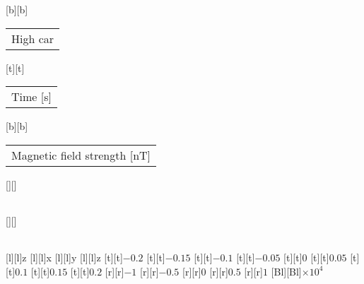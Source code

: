 %
[b][b]{\fontsize{8}{12}\selectfont \setlength{\tabcolsep}{0pt}\begin{tabular}{c}High car\end{tabular}}%
[t][t]{\fontsize{8}{12}\selectfont \setlength{\tabcolsep}{0pt}\begin{tabular}{c}Time [s]\end{tabular}}%
[b][b]{\fontsize{8}{12}\selectfont \setlength{\tabcolsep}{0pt}\begin{tabular}{c}Magnetic field strength [nT]\end{tabular}}%
[][]{\fontsize{10}{15}\selectfont \setlength{\tabcolsep}{0pt}\begin{tabular}{c} \end{tabular}}%
[][]{\fontsize{10}{15}\selectfont \setlength{\tabcolsep}{0pt}\begin{tabular}{c} \end{tabular}}%
[l][l]{\fontsize{6}{15}\selectfont z}%
[l][l]{\fontsize{6}{15}\selectfont x}%
[l][l]{\fontsize{6}{15}\selectfont y}%
[l][l]{\fontsize{6}{15}\selectfont z}%
%
\fontsize{6}{15}%
\selectfont%
%
[t][t]{$-0.2$}%
[t][t]{$-0.15$}%
[t][t]{$-0.1$}%
[t][t]{$-0.05$}%
[t][t]{$0$}%
[t][t]{$0.05$}%
[t][t]{$0.1$}%
[t][t]{$0.15$}%
[t][t]{$0.2$}%
%
[r][r]{$-1$}%
[r][r]{$-0.5$}%
[r][r]{$0$}%
[r][r]{$0.5$}%
[r][r]{$1$}%
[Bl][Bl]{$\times 10^{4}$}%
%
%
